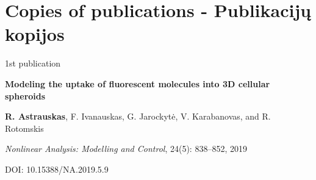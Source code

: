 \chapter*{Copies of publications - Publikacijų kopijos}
\label{cha:publicationscopies} 



\vspace*{15mm}

\begin{center}

{\huge 1st publication}
\vspace{10mm}

{\Large \bf Modeling the uptake of fluorescent molecules into 3D cellular spheroids}

\vspace{5mm}
\textbf{R. Astrauskas}, F. Ivanauskas, G. Jarockytė, V. Karabanovas, and R. Rotomskis

\vspace{5mm}
\textit{Nonlinear Analysis: Modelling and Control}, 24(5): 838--852, 2019


\vspace{3mm}
DOI: 10.15388/NA.2019.5.9

\end{center}

\newpage
